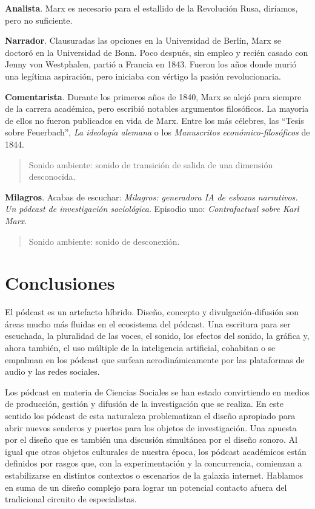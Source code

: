 \documentclass[
]{interact}
\begin{document}
\textbf{Analista}. Marx es necesario para el estallido de la Revolución
Rusa, diríamos, pero no suficiente.

\textbf{Narrador}. Clausuradas las opciones en la Universidad de Berlín,
Marx se doctoró en la Universidad de Bonn. Poco después, sin empleo y
recién casado con Jenny von Westphalen, partió a Francia en 1843. Fueron
los años donde murió una legítima aspiración, pero iniciaba con vértigo
la pasión revolucionaria.

\textbf{Comentarista}. Durante los primeros años de 1840, Marx se alejó
para siempre de la carrera académica, pero escribió notables argumentos
filosóficos. La mayoría de ellos no fueron publicados en vida de Marx.
Entre los más célebres, las ``Tesis sobre Feuerbach'', \emph{La
ideología alemana} o los \emph{Manuscritos económico-filosóficos} de
1844.

\begin{quote}
Sonido ambiente: sonido de transición de salida de una dimensión
desconocida.
\end{quote}

\textbf{Milagros}. Acabas de escuchar: \emph{Milagros: generadora IA de
esbozos narrativos. Un pódcast de investigación sociológica}. Episodio
uno: \emph{Contrafactual sobre Karl Marx}.

\begin{quote}
Sonido ambiente: sonido de desconexión.
\end{quote}

\section{Conclusiones}\label{conclusiones}

El pódcast es un artefacto híbrido. Diseño, concepto y
divulgación-difusión son áreas mucho más fluidas en el ecosistema del
pódcast. Una escritura para ser escuchada, la pluralidad de las voces,
el sonido, los efectos del sonido, la gráfica y, ahora también, el uso
múltiple de la inteligencia artificial, cohabitan o se empalman en los
pódcast que surfean aerodinámicamente por las plataformas de audio y las
redes sociales.

Los pódcast en materia de Ciencias Sociales se han estado convirtiendo
en medios de producción, gestión y difusión de la investigación que se
realiza. En este sentido los pódcast de esta naturaleza problematizan el
diseño apropiado para abrir nuevos senderos y puertos para los objetos
de investigación. Una apuesta por el diseño que es también una discusión
simultánea por el diseño sonoro. Al igual que otros objetos culturales
de nuestra época, los pódcast académicos están definidos por rasgos que,
con la experimentación y la concurrencia, comienzan a estabilizarse en
distintos contextos o escenarios de la galaxia internet. Hablamos en
suma de un diseño complejo para lograr un potencial contacto afuera del
tradicional circuito de especialistas.
\end{document}
